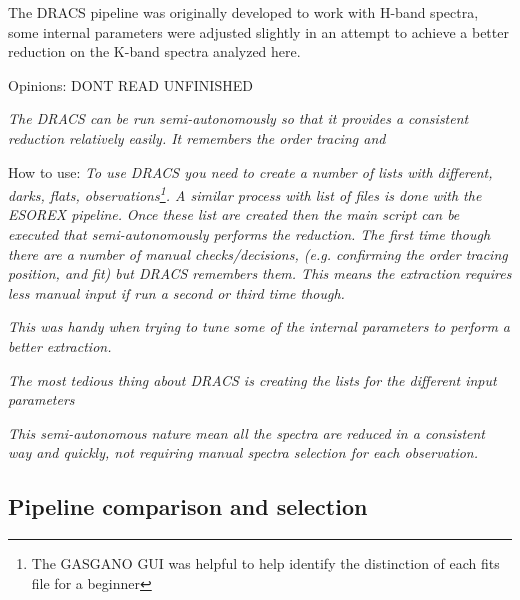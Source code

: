 The DRACS pipeline was originally developed to work with H-band spectra, some internal parameters were adjusted slightly in an attempt to achieve a better reduction on the K-band spectra analyzed here.


Opinions:
DONT READ UNFINISHED 

\textit{The DRACS can be run semi-autonomously so that it provides a consistent reduction relatively easily. It remembers the order tracing and}

How to use:
\textit{To use DRACS you need to create a number of lists with different, darks, flats, observations\footnote{The GASGANO GUI was helpful to help identify the distinction of each fits file for a beginner}. A similar process with list of files is done with the ESOREX pipeline.}
\textit{Once these list are created then the main script can be executed that semi-autonomously performs the reduction. The first time though there are a number of manual checks/decisions, (e.g. confirming the order tracing position, and fit) but DRACS remembers them. This means the extraction requires less manual input if run a second or third time though.}

\textit{This was handy when trying to tune some of the internal parameters to perform a better extraction.}


\textit{The most tedious thing about DRACS is creating the lists for the different input parameters}

\textit{This semi-autonomous nature mean all the spectra are reduced in a consistent way and quickly, not requiring manual spectra selection for each observation.}


\subsection{Pipeline comparison and selection}


